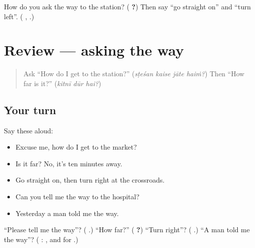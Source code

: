 \begin{tcolorbox}[breakable,colback=teal!4,colframe=teal!35!black,title={Before you move on}]
How do you ask the way to the station? (\textbf{   ?}) Then say \textquotedblleft{}go straight on\textquotedblright{} and \textquotedblleft{}turn left\textquotedblright{}. (\textbf{ }, \textbf{ }.)
\end{tcolorbox}
\section[(review)]{Review — asking the way}

\label{lesson:HI-R282-asking-the-way}



\begin{quote}
Ask \textquotedblleft{}How do I get to the station?\textquotedblright{} (\emph{sṭeśan kaise jāte haiṁ?}) Then \textquotedblleft{}How far is it?\textquotedblright{} (\emph{kitnī dūr hai?})
\end{quote}

\subsection*{Your turn}
Say these aloud:

\begin{itemize}
\raggedright
  \item Excuse me, how do I get to the market?
  \item Is it far? No, it's ten minutes away.
  \item Go straight on, then turn right at the crossroads.
  \item Can you tell me the way to the hospital?
  \item Yesterday a man told me the way.
\end{itemize}

\begin{tcolorbox}[breakable,colback=teal!4,colframe=teal!35!black,title={Before you move on}]
\textquotedblleft{}Please tell me the way\textquotedblright{}? (\textbf{  }.) \textquotedblleft{}How far?\textquotedblright{} (\textbf{ ?}) \textquotedblleft{}Turn right\textquotedblright{}? (\textbf{ }.) \textquotedblleft{}A man told me the way\textquotedblright{}? (\textbf{     }: \textbf{}, and \textbf{} for \textbf{}.)
\end{tcolorbox}
